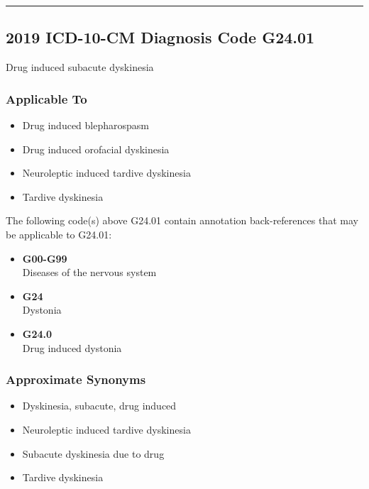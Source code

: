 \begin{paracol}{2}
\begin{leftcolumn}
\begin{center}\rule{0.5\linewidth}{\linethickness}\end{center}

\hypertarget{icd-10-cm-diagnosis-code-g24.01}{%
\subsection{2019 ICD-10-CM Diagnosis Code G24.01}\label{icd-10-cm-diagnosis-code-g24.01}}

\noindent Drug induced subacute dyskinesia

\hypertarget{applicable-to-2}{%
\subsubsection{Applicable To}\label{applicable-to-2}}

\begin{itemize}
\tightlist
\item
  Drug induced blepharospasm
\item
  Drug induced orofacial dyskinesia
\item
  Neuroleptic induced tardive dyskinesia
\item
  Tardive dyskinesia
\end{itemize}

\noindent The following code(s) above G24.01 contain annotation back-references that may be applicable to G24.01:

\begin{itemize}
\tightlist
\item
  \textbf{G00-G99}\\
  Diseases of the nervous system
\item
  \textbf{G24}\\
  Dystonia
\item
  \textbf{G24.0}\\
  Drug induced dystonia
\end{itemize}

\hypertarget{approximate-synonyms-2}{%
\subsubsection{Approximate Synonyms}\label{approximate-synonyms-2}}

\begin{itemize}
\tightlist
\item
  Dyskinesia, subacute, drug induced
\item
  Neuroleptic induced tardive dyskinesia
\item
  Subacute dyskinesia due to drug
\item
  Tardive dyskinesia
\end{itemize}


\end{leftcolumn}
\end{paracol}
